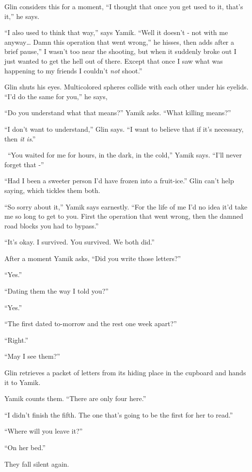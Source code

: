 \documentclass[twoside,11pt]{book}
\begin{document}
Glin considers this for a moment, ``I thought that once you get used to it, that's it,'' he
says.

``I also used to think that way,'' says Yamik. ``Well it doesn't - not with me anyway{\dots} Damn this
operation that went wrong,'' he hisses, then adds after a brief pause,'' I wasn't too near
the shooting, but when it suddenly{ }broke out I
just{ }wanted to get the hell out of there. Except that once I saw what was
happening to my friends I couldn't \textit{not} shoot.''

Glin shuts his eyes. Multicolored spheres collide with each other under his eyelids. ``I'd do the same for
you,'' he says,

``Do you understand what that means?'' Yamik asks. ``What killing
means?''

``I don't want to understand,'' Glin says. ``I want to believe that if it's
necessary, then \textit{it is}.''

~``You waited for me for hours, in the dark, in the cold,'' Yamik says. ``I'll
never forget that -''

``Had I been a sweeter person I'd have frozen into a fruit-ice.'' Glin can't help saying,
which tickles them both.

``So sorry about it,'' Yamik says earnestly. ``For the life of me I'd no idea
it'd take me so long to get to you. First the operation that went wrong, then the damned road blocks you had to
bypass.''

``It's okay. I survived. You survived. We both did.''

After a moment Yamik asks, ``Did you write those letters?''

``Yes.''

``Dating them the way I told you?''

``Yes.''

``The first dated to-morrow and the rest one week apart?''

``Right.''

``May I see them?''

Glin retrieves a packet of letters from its hiding place in the cupboard and hands it to Yamik.

Yamik counts them. ``There are only four here.''

``I didn't finish the fifth. The one that's going to be the first for her to read.''

``Where will you leave it?''

``On her bed.''

They fall silent again.
\end{document}
